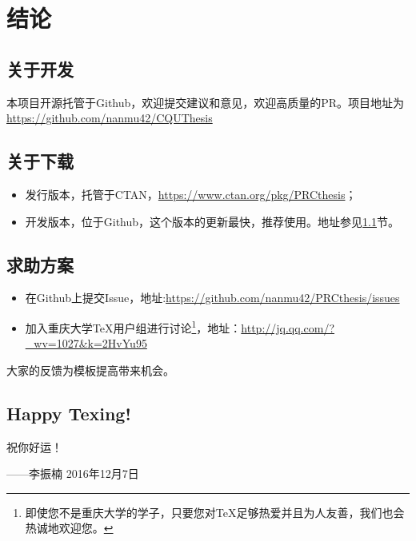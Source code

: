 \chapter{结论}
\section{关于开发}\label{sec:dev}
本项目开源托管于Github，欢迎提交建议和意见，欢迎高质量的PR。项目地址为\url{https://github.com/nanmu42/CQUThesis}
\section{关于下载}
\begin{itemize}
	\item 发行版本，托管于CTAN，\url{https://www.ctan.org/pkg/PRCthesis}；
	\item 开发版本，位于Github，这个版本的更新最快，推荐使用。地址参见\ref{sec:dev}节。
\end{itemize}
\section{求助方案}
\begin{itemize}
	\item 在Github上提交Issue，地址:\url{https://github.com/nanmu42/PRCthesis/issues}
	\item 加入重庆大学\TeX 用户组进行讨论\footnote{即使您不是重庆大学的学子，只要您对\TeX 足够热爱并且为人友善，我们也会热诚地欢迎您。}，地址：\url{http://jq.qq.com/?_wv=1027&k=2HvYu95}
\end{itemize}
 
大家的反馈为模板提高带来机会。
\section{Happy Texing!}
祝你好运！

\bigskip
\hfill ——李振楠 2016年12月7日
